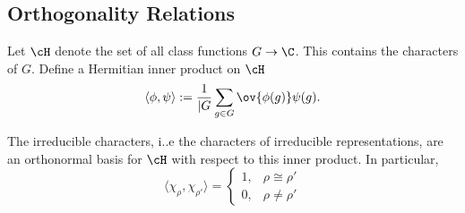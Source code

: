 \subsection{Orthogonality Relations}


Let $\cH$ denote the set of all class functions $G \to \C$. This contains the characters of $G$. Define a Hermitian inner product on $\cH$
	\[
	\langle \phi, \psi \rangle:= \dfrac{1}{|G} \sum_{g \in G} \ov{\phi(g)} \psi(g).
	\]



\begin{thm}
The irreducible characters, i..e the characters of irreducible representations, are an orthonormal basis for $\cH$ with respect to this inner product. In particular,
	\[
	\langle \chi_\rho, \chi_{\rho'} \rangle =
	\begin{cases}
	1, & \rho \cong \rho' \\
	0, & \rho \neq \rho'
	\end{cases}
	\]
\end{thm}

